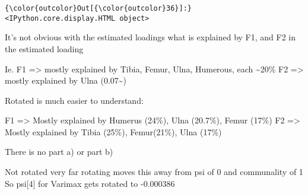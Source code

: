 \documentclass[11pt]{article}
\begin{document}
\begin{Verbatim}[commandchars=\\\{\}]
{\color{outcolor}Out[{\color{outcolor}36}]:} <IPython.core.display.HTML object>
\end{Verbatim}
            
    It's not obvious with the estimated loadings what is explained by F1,
and F2 in the estimated loading

Ie. F1 =\textgreater{} mostly explained by Tibia, Femur, Ulna, Humerous,
each \textasciitilde{}20\% F2 =\textgreater{} mostly explained by Ulna
(0.07\textasciitilde{})

Rotated is much easier to understand:

F1 =\textgreater{} Mostly explained by Humerus (24\%), Ulna (20.7\%),
Femur (17\%) F2 =\textgreater{} Mostly explained by Tibia (25\%),
Femur(21\%), Ulna (17\%)

There is no part a) or part b)

Not rotated very far rotating moves this away from psi of 0 and
communality of 1 So psi{[}4{]} for Varimax gets rotated to -0.000386

    


    
    
    
    
\end{document}
